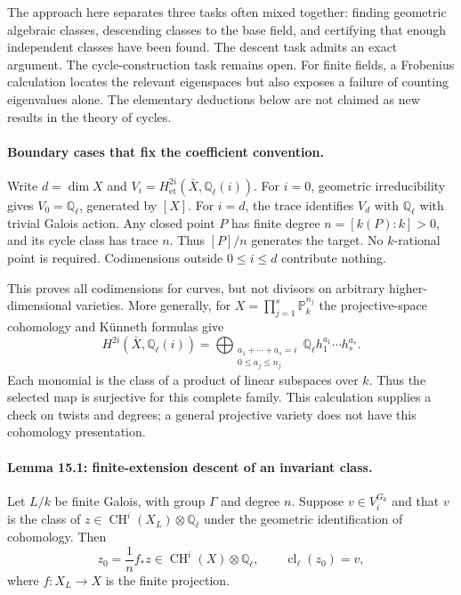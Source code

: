 \documentclass[11pt]{article}
\begin{document}
The approach here separates three tasks often mixed together: finding
 geometric algebraic classes, descending classes to the base field, and
 certifying that enough independent classes have been found. The descent
 task admits an exact argument. The cycle-construction task remains open.
 For finite fields, a Frobenius calculation locates the relevant eigenspaces
 but also exposes a failure of counting eigenvalues alone. The elementary
 deductions below are not claimed as new results in the theory of cycles.

\paragraph{Boundary cases that fix the coefficient convention.}
Write $d=\dim X$ and
 $V_i=H^{2i}_{\mathrm{\acute et}}(\bar X,\mathbb Q_\ell(i))$.
 For $i=0$, geometric irreducibility gives $V_0=\mathbb Q_\ell$, generated
 by $[X]$. For $i=d$, the trace identifies $V_d$ with $\mathbb Q_\ell$
 with trivial Galois action. Any closed point $P$ has finite degree
 $n=[k(P):k]>0$, and its cycle class has trace $n$. Thus $[P]/n$ generates
 the target. No $k$-rational point is required. Codimensions outside
 $0\leq i\leq d$ contribute nothing.

This proves all codimensions for curves, but not divisors on arbitrary
 higher-dimensional varieties. More generally, for
 $X=\prod_{j=1}^s\mathbb P_k^{n_j}$ the projective-space cohomology and
 K\"unneth formulas give
\[
 H^{2i}(\bar X,\mathbb Q_\ell(i))
 =\bigoplus_{\substack{a_1+\cdots+a_s=i\\0\leq a_j\leq n_j}}
       \mathbb Q_\ell h_1^{a_1}\cdots h_s^{a_s}.
\]
Each monomial is the class of a product of linear subspaces over $k$.
 Thus the selected map is surjective for this complete family. This
 calculation supplies a check on twists and degrees; a general projective
 variety does not have this cohomology presentation.

\paragraph{Lemma 15.1: finite-extension descent of an invariant class.}
Let $L/k$ be finite Galois, with group $\Gamma$ and degree $n$. Suppose
 $v\in V_i^{G_k}$ and that $v$ is the class of
 $z\in\operatorname{CH}^i(X_L)\otimes\mathbb Q_\ell$ under the geometric
 identification of cohomology. Then
\begin{equation}\label{tc:trace}
 z_0=\frac1n f_*z\in\operatorname{CH}^i(X)\otimes\mathbb Q_\ell,
 \qquad\operatorname{cl}_\ell(z_0)=v,
\end{equation}
where $f:X_L\to X$ is the finite projection.
\end{document}
